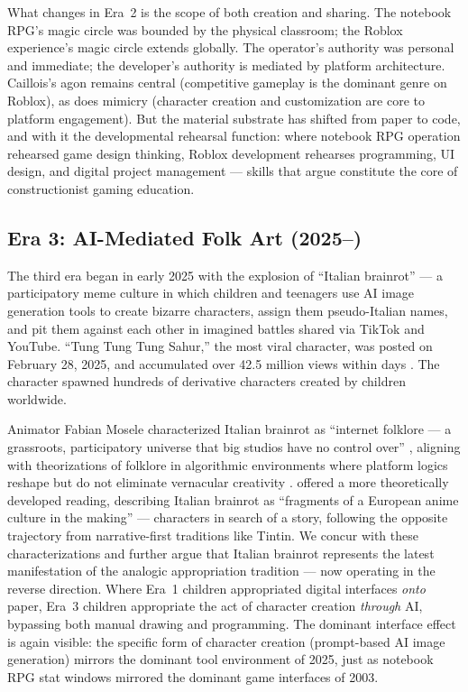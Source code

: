\documentclass[12pt]{article}
\begin{document}
What changes in Era~2 is the scope of both creation and sharing. The notebook RPG's magic circle was bounded by the physical classroom; the Roblox experience's magic circle extends globally. The operator's authority was personal and immediate; the developer's authority is mediated by platform architecture. Caillois's agon remains central (competitive gameplay is the dominant genre on Roblox), as does mimicry (character creation and customization are core to platform engagement). But the material substrate has shifted from paper to code, and with it the developmental rehearsal function: where notebook RPG operation rehearsed game design thinking, Roblox development rehearses programming, UI design, and digital project management --- skills that \citet{kafai2016} argue constitute the core of constructionist gaming education.

\subsection{Era 3: AI-Mediated Folk Art (2025--)}

The third era began in early 2025 with the explosion of ``Italian brainrot'' --- a participatory meme culture in which children and teenagers use AI image generation tools to create bizarre characters, assign them pseudo-Italian names, and pit them against each other in imagined battles shared via TikTok and YouTube. ``Tung Tung Tung Sahur,'' the most viral character, was posted on February 28, 2025, and accumulated over 42.5 million views within days \citep{kym2025}. The character spawned hundreds of derivative characters created by children worldwide.

Animator Fabian Mosele characterized Italian brainrot as ``internet folklore --- a grassroots, participatory universe that big studios have no control over'' \citep{abcnews2025}, aligning with theorizations of folklore in algorithmic environments where platform logics reshape but do not eliminate vernacular creativity \citep{flinterud2023}. \citet{barchiesi2025} offered a more theoretically developed reading, describing Italian brainrot as ``fragments of a European anime culture in the making'' --- characters in search of a story, following the opposite trajectory from narrative-first traditions like Tintin. We concur with these characterizations and further argue that Italian brainrot represents the latest manifestation of the analogic appropriation tradition --- now operating in the reverse direction. Where Era~1 children appropriated digital interfaces \emph{onto} paper, Era~3 children appropriate the act of character creation \emph{through} AI, bypassing both manual drawing and programming. The dominant interface effect is again visible: the specific form of character creation (prompt-based AI image generation) mirrors the dominant tool environment of 2025, just as notebook RPG stat windows mirrored the dominant game interfaces of 2003.
\end{document}
